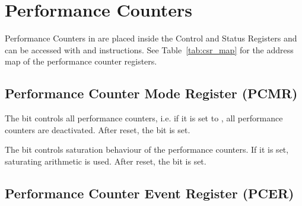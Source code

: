 \chapter{Performance Counters}
\label{chap:perf_count}

Performance Counters in \rvcore are placed inside the Control and Status
Registers and can be accessed with  and  instructions.
See Table~\ref{tab:csr_map} for the address map of the performance counter
registers.


\section{Performance Counter Mode Register (PCMR)}


The  bit controls all performance counters, i.e. if it is
set to , all performance counters are deactivated. After reset, the
 bit is set.

The  bit controls saturation behaviour of the performance
counters. If it is set, saturating arithmetic is used. After reset, the
 bit is set.

\section{Performance Counter Event Register (PCER)}

